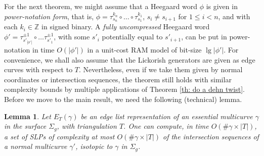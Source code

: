 \documentclass[11pt]{amsart}
\newcommand{\Z}{\mathbb{Z}}
\numberwithin{equation}{section}
\theoremstyle{plain}
\newtheorem{lemma}[equation]{Lemma}
\theoremstyle{definition}
\begin{document}
For the next theorem, we might assume that a Heegaard word $\phi$ is given in \textit{power-notation form}, that is, $\phi=\tau^{k_n}_{s_n}\circ \dots \circ \tau^{k_1}_{s_1}$, $s_i\neq s_{i+1}$ for $1\leq i< n$, and with each $k_i\in \Z$ in signed binary. 
A \textit{fully uncompressed} Heegaard word $\phi'=\tau^{\pm 1}_{s'_{|\phi'|}}\circ\dots \tau^{\pm 1}_{s'_1}$, with some $s'_i$ potentially equal to $s'_{i+1}$, can be put in power-notation in time $O(|\phi'|)$ in a unit-cost RAM model of bit-size $\lg |\phi'|$. 
For convenience, we shall also assume that the Lickorish generators are given as edge curves with respect to $T$.
Nevertheless, even if we take them given by normal coordinates or intersection sequences, the theorem still holds with similar complexity bounds by multiple applications of Theorem \ref{th: do a dehn twist}. 
Before we move to the main result, we need the following (technical) lemma.
\begin{lemma}\label{lm: get twins}
    Let $E_T(\gamma)$ be an edge list representation of an essential multicurve $\gamma$ in the surface $\Sigma_g$, with triangulation $T$. 
    One can compute, in time $O(\#\gamma \times |T|)$, a set of SLPs of complexity at most $O(\#\gamma \times |T|)$ of the intersection sequences of a normal multicurve $\gamma'$, isotopic to $\gamma$ in $\Sigma_g$.
\end{lemma}
\end{document}

